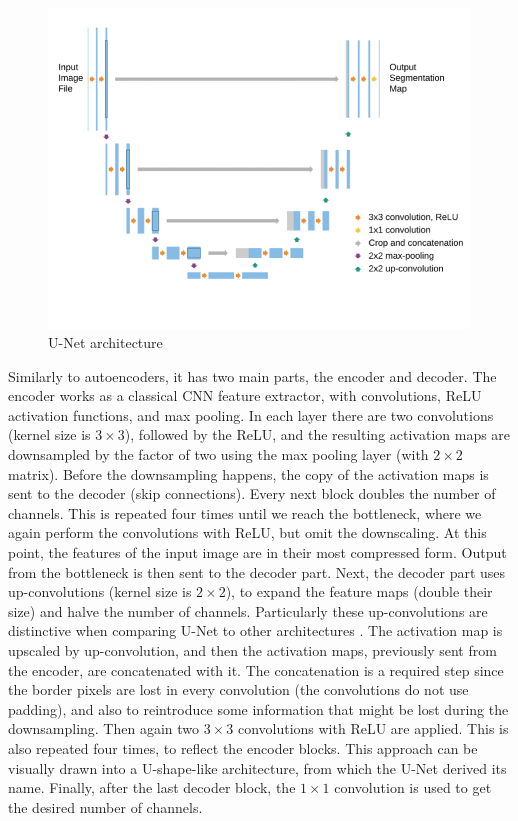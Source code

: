 \begin{figure}[H]
\begin{centering}
\includegraphics[width=12cm]{assets/images/unet.png}
\par\end{centering}
\caption{U-Net architecture \cite{Siddique2021}}
\label{fig:unet}
\end{figure}

Similarly to autoencoders, it has two main parts, the encoder and decoder. The encoder works as a classical CNN feature extractor, with convolutions, ReLU activation functions, and max pooling. In each layer there are two convolutions (kernel size is $3\!\times\!3$), followed by the ReLU, and the resulting activation maps are downsampled by the factor of two using the max pooling layer (with $2\!\times\!2$ matrix). Before the downsampling happens, the copy of the activation maps is sent to the decoder (skip connections). Every next block doubles the number of channels. This is repeated four times until we reach the bottleneck, where we again perform the convolutions with ReLU, but omit the downscaling. At this point, the features of the input image are in their most compressed form. Output from the bottleneck is then sent to the decoder part. Next, the decoder part uses up-convolutions (kernel size is $2\!\times\!2$), to expand the feature maps (double their size) and halve the number of channels. Particularly these up-convolutions are distinctive when comparing U-Net to other architectures \cite{Siddique2021}. The activation map is upscaled by up-convolution, and then the activation maps, previously sent from the encoder, are concatenated with it. The concatenation is a required step since the border pixels are lost in every convolution (the convolutions do not use padding), and also to reintroduce some information that might be lost during the downsampling. Then again two $3\!\times\!3$ convolutions with ReLU are applied. This is also repeated four times, to reflect the encoder blocks. This approach can be visually drawn into a U-shape-like architecture, from which the U-Net derived its name. Finally, after the last decoder block, the $1\!\times\!1$ convolution is used to get the desired number of channels.

